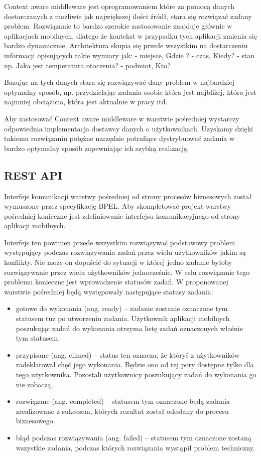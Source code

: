 Context aware middleware jest oprogramowaniem które za pomocą danych dostarczanych z możliwie jak największej ilości źródł, stara się rozwiązać zadany problem. Rozwiązanie to bardzo szerokie zastosowanie znajduje głównie w aplikacjach mobilnych, dlatego że kontekst w przypadku tych aplikacji zmienia się bardzo dynamicznie. Architektura skupia się przede wszystkim na dostarczeniu informacji opisujących takie wymiary jak: - miejsce, Gdzie ? - czas, Kiedy? - stan np. Jaka jest temperatura otoczenia? - podmiot, Kto?

Bazując na tych danych stara się rozwiązywać dany problem w najbardziej optymalny sposób, np. przydzielając zadania osobie która jest najbliżej, która jest najmniej obciążona, która jest aktualnie w pracy itd.

Aby zastosować Context aware middleware w warstwie pośredniej wystarczy odpowiednia implementacja dostawcy danych o użytkownikach. Uzyskamy dzięki takiemu rozwiązaniu potężne narzędzie potrafiące dystrybuować zadania w bardzo optymalny sposób zapewniając ich szybką realizację.  

\subsection{REST API}

Interfejs komunikacji warstwy pośredniej od strony procesów biznesowych został wymuszony przez specyfikację BPEL. Aby skompletować projekt warstwy pośredniej konieczne jest zdefiniowanie interfejsu komunikacyjnego od strony aplikacji mobilnych. 

Interfejs ten powinien przede wszystkim rozwiązywać podstawowy problem występujący podczas rozwiązywania zadań przez wielu użytkowników jakim są konflikty. Nie może on dopuścić do sytuacji w której jedno zadanie byłoby rozwiązywanie przez wielu użytkowników jednocześnie. W celu rozwiązanie tego problemu konieczne jest wprowadzenie statusów zadań. W proponowanej warstwie pośredniej będą występowały następujące statusy zadania:

\begin{itemize}
\item gotowe do wykonania (ang. ready) -- zadanie zostanie oznaczone tym statusem tuż po utworzeniu zadania. Użytkownik aplikacji mobilnych poszukując zadań do wykonania otrzyma listę zadań oznaczonych właśnie tym statusem. 
\item przypisane (ang. climed) -- status ten oznacza, że któryś z użytkowników zadeklarował chęć jego wykonania. Będzie ono od tej pory dostępne tylko dla tego użytkownika. Pozostali użytkownicy poszukujący zadań do wykonania go nie zobaczą. 
\item rozwiązane (ang. completed) -- statusem tym oznaczone będą zadania zrealizowane z sukcesem, których rezultat został odesłany do procesu biznesowego. 
\item błąd podczas rozwiązywania (ang. failed) -- statusem tym oznaczone zostaną wszystkie zadania, podczas których rozwiązania wystąpił problem techniczny. 
\end{itemize}

